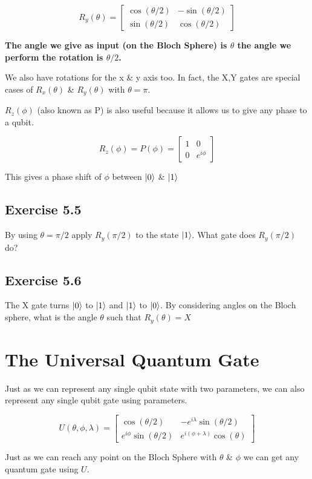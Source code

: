 \documentclass{book}
\begin{document}
$$
R_y(\theta) = \begin{bmatrix} \cos(\theta /2) & -\sin(\theta /2) \\ \sin(\theta /2) & \cos(\theta /2) \end{bmatrix}
$$

\textbf{The angle we give as input (on the Bloch Sphere) is $\theta$ the angle we perform the rotation is $\theta/2$.}

We also have rotations for the x \& y axis too. In fact, the X,Y gates are special cases of $R_x(\theta)$ & $R_y(\theta)$ with $\theta = \pi$. 

$R_z(\phi)$ (also known as P) is also useful because it allows us to give any phase to a qubit. 

$$
R_z(\phi) = P(\phi) = \begin{bmatrix} 1 & 0 \\ 0 & e^{i\phi} \end{bmatrix}
$$

This gives a phase shift of $\phi$ between $\ket{0}$ \& $\ket{1}$

\hline
\subsection{Exercise 5.5}
By using $\theta = \pi/2$ apply $R_y(\pi/2)$ to the state $\ket{1}$. What gate does $R_y(\pi/2)$ do? 
 
\subsection{Exercise 5.6} 
The X gate turns $\ket{0}$ to $\ket{1}$ and $\ket{1}$ to $\ket{0}$. By considering angles on the Bloch sphere, what is the angle $\theta$ such that $R_y(\theta) = X$
\hline

\section{ The Universal Quantum Gate }

Just as we can represent any single qubit state with two parameters, we can also represent any single qubit gate using parameters. 

$$
U(\theta, \phi, \lambda) = \begin{bmatrix} \cos(\theta/2) & -e^{i\lambda}\sin(\theta/2) \\ e^{i\phi}\sin(\theta/2) & e^{i(\phi + \lambda)}\cos(\theta) \end{bmatrix} 
$$

Just as we can reach any point on the Bloch Sphere with $\theta$ \& $\phi$ we can get any quantum gate using $U$. 
\end{document}
